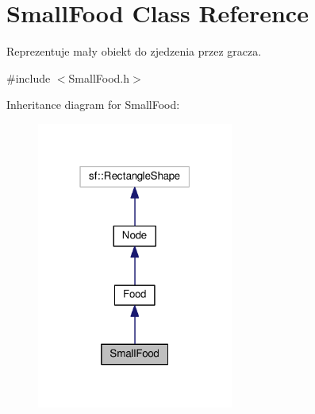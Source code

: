\hypertarget{classSmallFood}{}\section{Small\+Food Class Reference}
\label{classSmallFood}


Reprezentuje mały obiekt do zjedzenia przez gracza.  




{\ttfamily \#include $<$Small\+Food.\+h$>$}



Inheritance diagram for Small\+Food\+:\nopagebreak
\begin{figure}[H]
\begin{center}
\leavevmode
\includegraphics[width=183pt]{classSmallFood__inherit__graph}
\end{center}
\end{figure}


